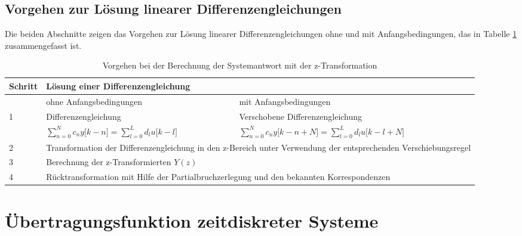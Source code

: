 \subsection{\texorpdfstring{Vorgehen zur Lösung linearer Differenzengleichungen }{Vorgehen zur Lösung linearer Differenzengleichungen }}\label{vorgehen-zur-luxf6sung-linearer-differenzengleichungen}

Die beiden Abschnitte zeigen das Vorgehen zur Lösung linearer Differenzengleichungen ohne und mit Anfangsbedingungen, das in Tabelle \ref{tab:6.1} zusammengefasst ist.

\begin{table}
  \centering
  \caption{Vorgehen bei der Berechnung der Systemantwort mit der z-Transformation}
  \label{tab:6.1}
  \begin{tabular}{lll}
    \toprule
    Schritt & \multicolumn{2}{l}{%
Lösung einer Differenzengleichung} \\
    \midrule
    & ohne Anfangsbedingungen & mit Anfangsbedingungen \\
    1 & Differenzengleichung & Verschobene Differenzengleichung \\
    & \(\sum\limits_{n = 0}^{N}{c_{n}  y\lbrack k - n\rbrack} = \sum\limits_{l = 0}^{L}{d_{l}  u\lbrack k - l\rbrack}\) & \(\sum\limits_{n = 0}^{N}{c_{n}  y\lbrack k - n + N\rbrack} = \sum\limits_{l = 0}^{L}{d_{l}  u\lbrack k - l + N\rbrack}\) \\
    2 & \multicolumn{2}{l}{%
Transformation der Differenzengleichung in den z-Bereich unter Verwendung der entsprechenden Verschiebungsregel} \\
    3 & \multicolumn{2}{l}{%
Berechnung der z-Transformierten \(Y(z)\)} \\
    4 & \multicolumn{2}{l}{%
Rücktransformation mit Hilfe der Partialbruchzerlegung und den bekannten Korrespondenzen} \\
    \bottomrule
  \end{tabular}
\end{table}

\section{Übertragungsfunktion zeitdiskreter Systeme}\label{sec:6.2}

